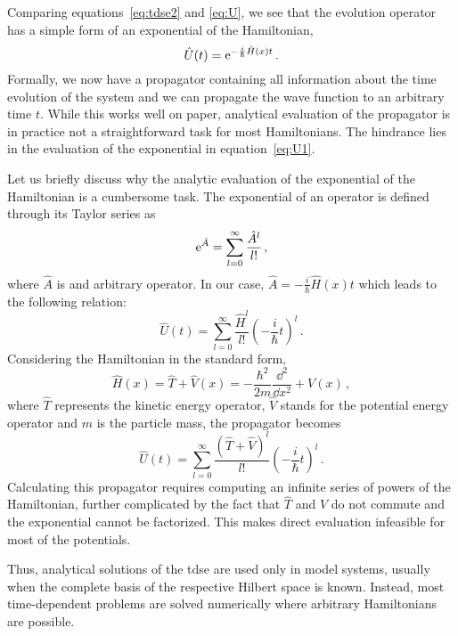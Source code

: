 Comparing equations~\eqref{eq:tdse2} and \eqref{eq:U}, we see that the evolution operator has a simple form of an exponential of the Hamiltonian,
\begin{equation}
    \hat{U}(t) = \mathrm{e}^{-\frac{i}{\hbar}\hat{H}(x)t} \, .
    \label{eq:U1}
\end{equation}
Formally, we now have a propagator containing all information about the time evolution of the system and we can propagate the wave function to an arbitrary time $t$. While this works well on paper, analytical evaluation of the propagator is in practice not a straightforward task for most Hamiltonians. The hindrance lies in the evaluation of the exponential in equation~\eqref{eq:U1}.

Let us briefly discuss why the analytic evaluation of the exponential of the Hamiltonian is a cumbersome task. The exponential of an operator is defined through its Taylor series as
\begin{equation}
    \mathrm{e}^{\hat{A}} = \sum_{l=0}^\infty \frac{\hat{A}^l}{l!} \, ,
\end{equation}
where $\hat{A}$ is and arbitrary operator. In our case, $\hat{A} = -\frac{i}{\hbar}\hat{H}(x)t$ which leads to the following relation:
\begin{equation}
    \hat{U}(t) = \sum_{l=0}^\infty \frac{\hat{H}^l}{l!} \left( -\frac{i}{\hbar} t\right)^l \, .
    \label{eq:U2}
\end{equation}
Considering the Hamiltonian in the standard form,
\begin{equation}
    \hat{H}(x) = \hat{T} + \hat{V}(x) = -\frac{\hbar^2}{2m}\frac{\dd^2}{\dd x^2} + V(x)\, ,
    \label{eq:Ham1}
\end{equation}
where $\hat{T}$ represents the kinetic energy operator, $\hat{V}$ stands for the potential energy operator and $m$ is the particle mass, the propagator becomes
\begin{equation}
    \hat{U}(t) = \sum_{l=0}^\infty \frac{(\hat{T}+\hat{V})^l}{l!} \left( -\frac{i}{\hbar} t\right)^l \, .
    \label{eq:U3}
\end{equation}
Calculating this propagator requires computing an infinite series of powers of the Hamiltonian, further complicated by the fact that $\hat{T}$ and $\hat{V}$ do not commute and the exponential cannot be factorized. This makes direct evaluation infeasible for most of the potentials.

Thus, analytical solutions of the \acrshort{tdse} are used only in model systems, usually when the complete basis of the respective Hilbert space is known. Instead, most time-dependent problems are solved numerically where arbitrary Hamiltonians are possible. 

